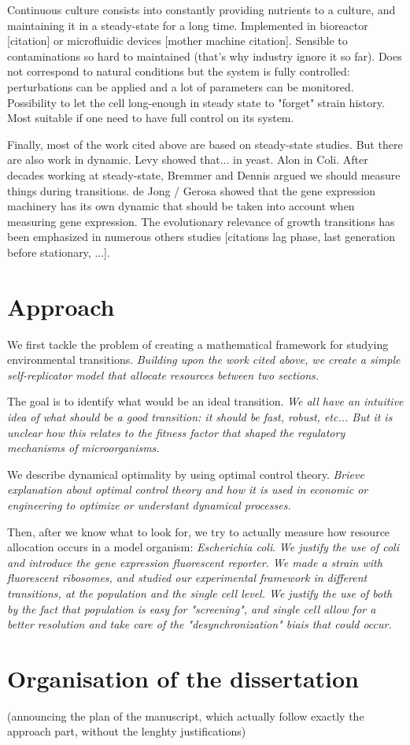 Continuous culture consists into constantly providing nutrients to a culture, and maintaining it in a steady-state for a long time.
Implemented in bioreactor [citation] or microfluidic devices [mother machine citation].
Sensible to contaminations so hard to maintained (that's why industry ignore it so far).
Does not correspond to natural conditions but the system is fully controlled: perturbations can be applied and a lot of parameters can be monitored.
Possibility to let the cell long-enough in steady state to "forget" strain history.
Most suitable if one need to have full control on its system.

Finally, most of the work cited above are based on steady-state studies.
But there are also work in dynamic.
Levy showed that... in yeast.
Alon in Coli.
After decades working at steady-state, Bremmer and Dennis argued we should measure things during transitions.
de Jong / Gerosa showed that the gene expression machinery has its own dynamic that should be taken into account when measuring gene expression.
The evolutionary relevance of growth transitions has been emphasized in numerous others studies [citations lag phase, last generation before stationary, ...].

\section{Approach}
\label{sec:approach}

We first tackle the problem of creating a mathematical framework for studying environmental transitions.
\textit{Building upon the work cited above, we create a simple self-replicator model that allocate resources between two sections.}

The goal is to identify what would be an ideal transition.
\textit{We all have an intuitive idea of what should be a good transition: it should be fast, robust, etc... But it is unclear how this relates to the fitness factor that shaped the regulatory mechanisms of microorganisms.}

We describe dynamical optimality by using optimal control theory.
\textit{Brieve explanation about optimal control theory and how it is used in economic or engineering to optimize or understant dynamical processes.}

Then, after we know what to look for, we try to actually measure how resource allocation occurs in a model organism: \textit{Escherichia coli}.
\textit{We justify the use of coli and introduce the gene expression fluorescent reporter.
We made a strain with fluorescent ribosomes, and studied our experimental framework in different transitions, at the population and the single cell level.
We justify the use of both by the fact that population is easy for "screening", and single cell allow for a better resolution and take care of the "desynchronization" biais that could occur.}

\section{Organisation of the dissertation}

(announcing the plan of the manuscript, which actually follow exactly the approach part, without the lenghty justifications)